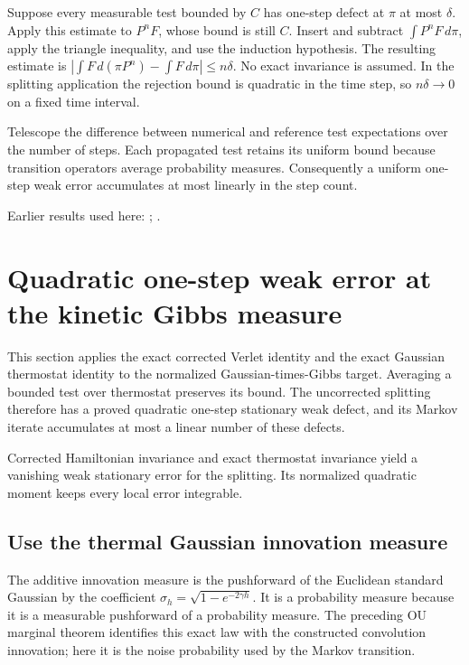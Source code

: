 \documentclass[11pt,a4paper]{report}
\begin{document}
Suppose every measurable test bounded by \(C\) has one-step defect at \(\pi\) at most \(\delta\). Apply this estimate to \(P^nF\), whose bound is still \(C\). Insert and subtract \(\int P^nF\,d\pi\), apply the triangle inequality, and use the induction hypothesis. The resulting estimate is \(\left|\int F\,d(\pi P^n)-\int F\,d\pi\right|\le n\delta\). No exact invariance is assumed. In the splitting application the rejection bound is quadratic in the time step, so \(n\delta\to0\) on a fixed time interval.



Telescope the difference between numerical and reference test expectations over the number of steps. Each propagated test retains its uniform bound because transition operators average probability measures. Consequently a uniform one-step weak error accumulates at most linearly in the step count.



Earlier results used here: \cite[Section~3.33.5]{LangevinLean2026ULASC}; \cite[Section~3.33.6]{LangevinLean2026ULASC}.
\section{\texorpdfstring{Quadratic one-step weak error at the kinetic Gibbs measure}{Quadratic one-step weak error at the kinetic Gibbs measure}}
\label{proof-module-KineticLangevin-SplittingTarget-lean}


This section applies the exact corrected Verlet identity and the exact Gaussian thermostat identity to the normalized Gaussian-times-Gibbs target. Averaging a bounded test over thermostat preserves its bound. The uncorrected splitting therefore has a proved quadratic one-step stationary weak defect, and its Markov iterate accumulates at most a linear number of these defects.



Corrected Hamiltonian invariance and exact thermostat invariance yield a vanishing weak stationary error for the splitting. Its normalized quadratic moment keeps every local error integrable.

\subsection{\texorpdfstring{Use the thermal Gaussian innovation measure}{Use the thermal Gaussian innovation measure}}
\label{report-step-KineticLangevin-SplittingTarget-lean-1}


The additive innovation measure is the pushforward of the Euclidean standard Gaussian by the coefficient \(\sigma_h=\sqrt{1-e^{-2\gamma h}}\). It is a probability measure because it is a measurable pushforward of a probability measure. The preceding OU marginal theorem identifies this exact law with the constructed convolution innovation; here it is the noise probability used by the Markov transition.
\end{document}
